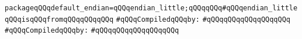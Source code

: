 \label{src/app/c-glue-maker/default-endian-little.pkg}
\verb|packageqQQqdefault_endian=qQQqendian_little;qQQqqQQq#qQQqendian_littleqQQqisqQQqfromqQQqqQQqqQQq|\newline
\verb|#qQQqCompiledqQQqby:|\newline
\verb|#qQQqqQQqqQQqqQQqqQQq|\newline
\newline
\verb|#qQQqCompiledqQQqby:|\newline
\verb|#qQQqqQQqqQQqqQQqqQQq|\newline
\newline

